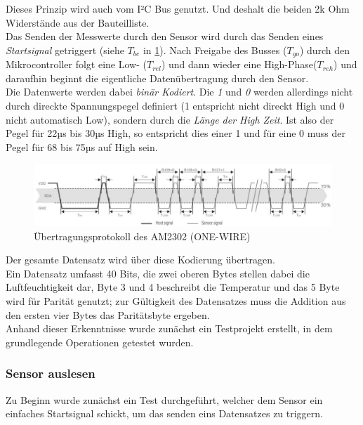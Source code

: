 \documentclass[11pt,a4paper,titlepage]{article}
\begin{document}
Dieses Prinzip wird auch vom I²C Bus genutzt.
Und deshalt die beiden 2k Ohm Widerstände aus der Bauteilliste.\\

Das Senden der Messwerte durch den Sensor wird durch das Senden eines \textit{Startsignal} getriggert (siehe $T_{be}$ in \cref{fig:ONE-WIRE}).
Nach Freigabe des Busses ($T_{go}$) durch den Mikrocontroller folgt eine Low- ($T_{rel}$) und dann wieder eine High-Phase($T_{reh}$)
und daraufhin beginnt die eigentliche Datenübertragung durch den Sensor.\\

Die Datenwerte werden dabei \textit{binär Kodiert}.
Die \textit{1} und \textit{0} werden allerdings nicht durch direckte Spannungspegel
definiert (1 entspricht nicht direckt High und 0 nicht automatisch Low), sondern durch die \textit{Länge der High Zeit}.
Ist also der Pegel für 22µs bis 30µs High, so entspricht dies einer 1 und für eine 0 muss der Pegel für 68 bis 75µs auf High sein.

\begin{figure}[H]
    \centering
    \includegraphics[width=1.1\textwidth]{./Bilder-Tobit/one-wire-protokoll.PNG}
    \caption{Übertragungsprotokoll des AM2302 (ONE-WIRE)}
    \label{fig:ONE-WIRE}
\end{figure}

Der gesamte Datensatz wird über diese Kodierung übertragen.\\
Ein Datensatz umfasst 40 Bits,
die zwei oberen Bytes stellen dabei die Luftfeuchtigkeit dar, Byte 3 und 4 beschreibt die Temperatur und das 5 Byte wird für Parität genutzt;
zur Gültigkeit des Datensatzes muss die Addition aus den ersten vier Bytes das Paritätsbyte ergeben.\\

Anhand dieser Erkenntnisse wurde zunächst ein Testprojekt erstellt, in dem grundlegende Operationen getestet wurden.

\subsubsection{Sensor auslesen}
\label{sec:sensor_auslesen}
Zu Beginn wurde zunächst ein Test durchgeführt, welcher dem Sensor ein einfaches Startsignal schickt, um das senden eins Datensatzes zu triggern.\\
\end{document}
